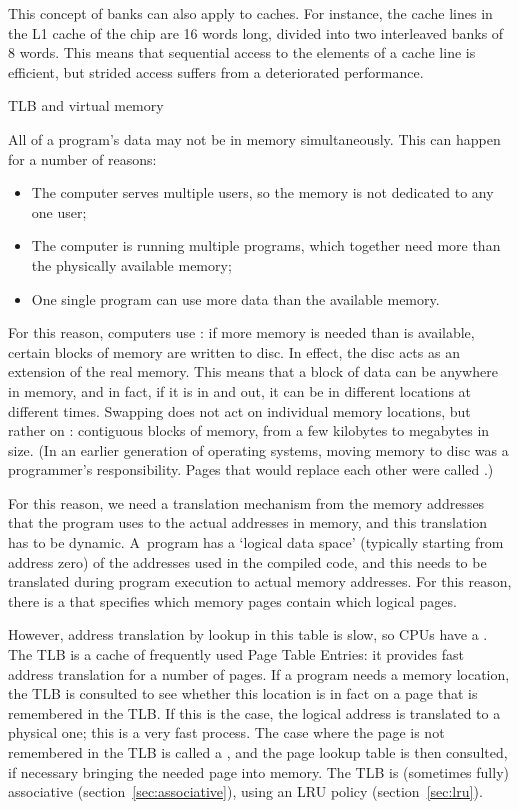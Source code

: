 This concept of banks can also apply to caches. For instance, the
cache lines in the L1 cache of the  chip
are 16 words long, divided into two interleaved banks of 8 words. This
means that sequential access to the elements of a cache line is
efficient, but strided access suffers from a deteriorated performance.


 {TLB and virtual memory}
\label{sec:tlb}

All of a program's data may not be in memory simultaneously. This can
happen for a number of reasons:
\begin{itemize}
\item The computer serves multiple users, so the memory is not
  dedicated to any one user;
\item The computer is running multiple programs, which together need
  more than the physically available memory;
\item One single program can use more data than the available memory.
\end{itemize}
For this reason, computers use : if more
memory is needed than is available, certain blocks of memory are
written to disc. In effect, the disc acts as an extension of the real
memory. This means that a block of data can be anywhere in memory, and
in fact, if it is  in and out, it can be in
different locations at different times. Swapping does not act on
individual memory locations, but rather on :
contiguous blocks of memory, from a few kilobytes to megabytes in size.
(In an earlier generation of operating systems, moving memory to disc
was a programmer's responsibility. Pages that would replace each other
were called .)

For this reason, we need a translation mechanism from the memory
addresses that the program uses to the actual addresses in memory, and
this translation has to be dynamic. A~program has a `logical data
space' (typically starting from address zero) of the addresses used in
the compiled code, and this needs to be translated during program
execution to actual memory addresses. For this reason, there is a
 that specifies which memory pages contain which
logical pages.

However, address translation by lookup in this table is slow, so CPUs
have a .
The \ac{TLB} is a cache of frequently used 
Page Table Entries: it provides fast address translation for a number
of pages. If a program needs a memory
location, the \ac{TLB} is consulted to see whether this location is in fact
on a page that is remembered in the \ac{TLB}. 
If this is the case, the logical address is
translated to a physical one; this is a very fast process. The case
where the page is not remembered in the \ac{TLB} is called a
, and the page lookup table is then consulted,
if necessary bringing the needed page into memory.
The \ac{TLB} is (sometimes fully) associative
(section~\ref{sec:associative}), using an LRU policy
(section~\ref{sec:lru}).

